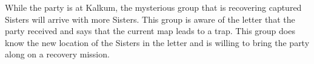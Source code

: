 While the party is at Kalkum, the mysterious group that is recovering captured Sisters will arrive with more Sisters.
This group is aware of the letter that the party received and says that the current map leads to a trap.
This group does know the new location of the Sisters in the letter and is willing to bring the party along on a recovery mission.
